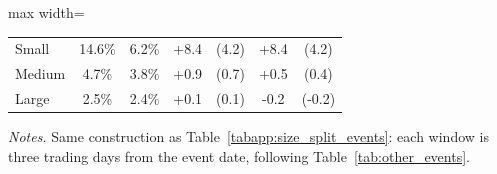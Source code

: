 \begin{table}[htbp]
\begin{adjustbox}{max width=\textwidth}
\begin{tabular}{lcccccc}
\quad Small & 14.6\% & 6.2\% & +8.4 & (4.2) & +8.4 & (4.2) \\
\quad Medium & 4.7\% & 3.8\% & +0.9 & (0.7) & +0.5 & (0.4) \\
\quad Large & 2.5\% & 2.4\% & +0.1 & (0.1) & -0.2 & (-0.2) \\
\bottomrule
\end{tabular}
\end{adjustbox}
\medskip
\begin{minipage}{0.95\textwidth}\footnotesize \textit{Notes.} Same construction as Table~\ref{tabapp:size_split_events}: each window is three trading days from the event date, following Table~\ref{tab:other_events}.\end{minipage}
\end{table}
